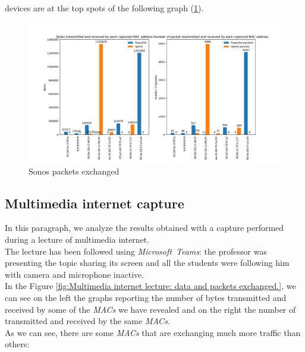 devices are at the top spots of the following graph (\ref{fig:Sonos_packets}).
\begin{figure}[h]
    \includegraphics[width=\textwidth]{Graphs/SONOS_bytes_packets.png}
    \caption{Sonos packets exchanged}
    \label{fig:Sonos_packets}
\end{figure}


\subsection{Multimedia internet capture}
In this paragraph, we analyze the results obtained with a capture performed during a lecture of
multimedia internet. \\ 
The lecture has been followed using \textit{Microsoft\ Teams}: the professor was presenting the
topic sharing its screen and all the students were following him with camera and microphone inactive.\\
In the Figure \ref{fig:Multimedia internet lecture: data and packets exchanged.}, we can see on the
left the graphs reporting the number of bytes transmitted and received by some of the \textit{MACs}
we have revealed and on the right the number of transmitted and received by the same \textit{MACs}.\\
As we can see, there are some \textit{MACs} that are exchanging much more traffic than others:

